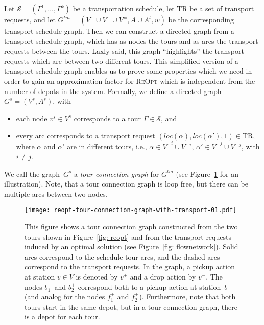 \documentclass[english]{llncs}
\numberwithin{sublemma}{lemma}
\newcommand{\aloc}{\ensuremath{loc}}
\newcommand{\tourd}{\ensuremath{\Gamma}}
\newcommand{\action}{\ensuremath{\alpha}}
\newcommand{\sched}{\mathcal{S}}
\newcommand{\schedule}{\sched}
\newcommand{\TR}{\mathrm{TR}}
\newcommand{\REOPT}{\textsc{ReOpt}\xspace}
\newcommand{\Vpick}{{V^+}}
\newcommand{\Vdrop}{{V^-}}
\newcommand{\Vbal}{{V^=}}
\begin{document}
Let $\schedule = (\tourd^1, \dotsc, \tourd^k)$ be a transportation schedule, let $\TR$ be a set of transport requests, and let $G^{tm} = (\Vpick \cup \Vdrop \cup \Vbal, A \cup A^t, w)$ be the corresponding transport schedule graph.
Then we can construct a directed graph from a transport schedule graph, which has as nodes the tours and as arcs the transport requests between the tours.
Laxly said, this graph ``highlights'' the transport requests which are between two different tours.
This simplified version of a transport schedule graph enables us to prove some properties which we need in order to gain an approximation factor for \REOPT which is independent from the number of depots in the system.
Formally, we define a directed graph $G^s = (V^s, A^s)$, with
\begin{itemize}
 \item each node $v^s \in V^s$ corresponds to a tour $\tourd \in \schedule$, and
 \item every arc corresponds to a transport request $(\aloc(\action), \aloc(\action'), 1) \in \TR$, where $\action$ and $\action'$ are in different tours, i.e., $\action \in \Vpick^i \cup \Vdrop^i$, $\action' \in \Vpick^j \cup \Vdrop^j$, with $i \neq j$.
\end{itemize}
We call the graph~$G^s$ a \emph{tour connection graph} for $G^{tm}$ (see Figure~\ref{fig: static: reopt: multiple: tour connection graph} for an illustration).
Note, that a tour connection graph is loop free, but there can be multiple arcs between two nodes.



\begin{figure}[ht]
    \centering
    \texttt{[image: reopt-tour-connection-graph-with-transport-01.pdf]}
 \caption{
  This figure shows a tour connection graph constructed from the two tours shown in Figure~\ref{fig: reopt} and from the transport requests induced by an optimal solution (see Figure~\ref{fig: flownetwork}).
  Solid arcs correspond to the schedule tour arcs, and the dashed arcs correspond to the transport requests.
  In the graph, a pickup action at station $v \in V$ is denoted by $v^+$ and a drop action by $v^-$.
  The nodes $b^+_1$ and $b^+_2$ correspond both to a pickup action at station~$b$ (and analog for the nodes $f^+_1$ and $f^+_2$).
  Furthermore, note that both tours start in the same depot, but in a tour connection graph, there is a depot for each tour.
 }
 \label{fig: static: reopt: multiple: tour connection graph}
\end{figure}
\end{document}
